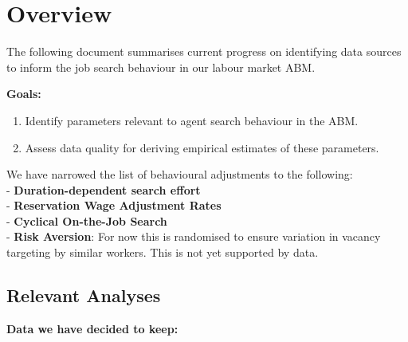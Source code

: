 \section{Overview}\label{overview}

The following document summarises current progress on identifying data
sources to inform the job search behaviour in our labour market ABM.

\textbf{Goals:}

\begin{enumerate}
\def\labelenumi{\arabic{enumi}.}
\item
  Identify parameters relevant to agent search behaviour in the ABM.
\item
  Assess data quality for deriving empirical estimates of these
  parameters.
\end{enumerate}

We have narrowed the list of behavioural adjustments to the following:\\
- \textbf{Duration-dependent search effort}\\
- \textbf{Reservation Wage Adjustment Rates}\\
- \textbf{Cyclical On-the-Job Search}\\
- \textbf{Risk Aversion}: For now this is randomised to ensure variation
in vacancy targeting by similar workers. This is not yet supported by
data.

\subsection{\texorpdfstring{\textbf{Relevant
Analyses}}{Relevant Analyses}}\label{relevant-analyses}

\textbf{Data we have decided to keep:}

